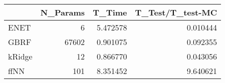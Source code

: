 \begin{tabular}{lrrr}
\toprule
{} &  N\_Params &    T\_Time &  T\_Test/T\_test-MC \\
\midrule
ENET   &         6 &  5.472578 &          0.010444 \\
GBRF   &     67602 &  0.901075 &          0.092355 \\
kRidge &        12 &  0.866770 &          0.043056 \\
ffNN   &       101 &  8.351452 &          9.640621 \\
\bottomrule
\end{tabular}
